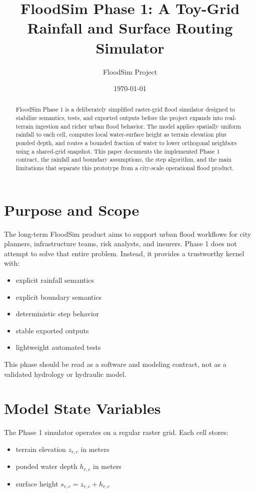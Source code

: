 \documentclass[10pt]{article}
\title{FloodSim Phase 1: A Toy-Grid Rainfall and Surface Routing Simulator}
\author{FloodSim Project}
\date{\today}
\begin{document}
\maketitle

\begin{abstract}
FloodSim Phase 1 is a deliberately simplified raster-grid flood simulator designed to stabilize semantics, tests, and exported outputs before the project expands into real-terrain ingestion and richer urban flood behavior. The model applies spatially uniform rainfall to each cell, computes local water-surface height as terrain elevation plus ponded depth, and routes a bounded fraction of water to lower orthogonal neighbors using a shared-grid snapshot. This paper documents the implemented Phase 1 contract, the rainfall and boundary assumptions, the step algorithm, and the main limitations that separate this prototype from a city-scale operational flood product.
\end{abstract}

\section{Purpose and Scope}

The long-term FloodSim product aims to support urban flood workflows for city planners, infrastructure teams, risk analysts, and insurers. Phase 1 does not attempt to solve that entire problem. Instead, it provides a trustworthy kernel with:

\begin{itemize}
    \item explicit rainfall semantics
    \item explicit boundary semantics
    \item deterministic step behavior
    \item stable exported outputs
    \item lightweight automated tests
\end{itemize}

This phase should be read as a software and modeling contract, not as a validated hydrology or hydraulic model.

\section{Model State Variables}

The Phase 1 simulator operates on a regular raster grid. Each cell stores:

\begin{itemize}
    \item terrain elevation $z_{r,c}$ in meters
    \item ponded water depth $h_{r,c}$ in meters
    \item surface height $s_{r,c} = z_{r,c} + h_{r,c}$
\end{itemize}
\end{document}
